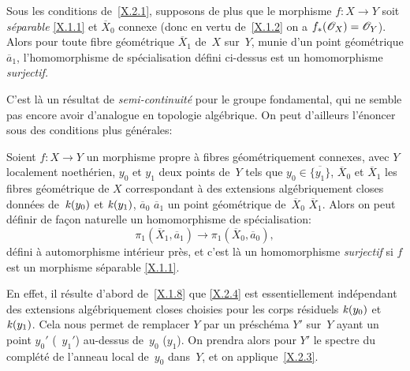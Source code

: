 \begin{corollaire}
\label{X.2.3}
Sous les conditions de~\ref{X.2.1}, supposons de plus que le morphisme
$f\colon X\to Y$ soit \emph{séparable} \eqref{X.1.1} et $\overline
X_0$ connexe (donc en vertu de~\ref{X.1.2} on a
$f_*(\cal{O}_X)=\cal{O}_Y$). Alors pour toute fibre
g\'eom\'etrique $\overline X_1$ de~$X$ sur~$Y$, munie d'un point
g\'eom\'etrique $\overline a_1$, l'homomorphisme de
sp\'ecialisation
d\'efini ci-dessus est un homomorphisme \emph{surjectif.}
\end{corollaire}
C'est l\`a un r\'esultat de \emph{semi-continuité} pour le
groupe fondamental, qui ne semble pas encore avoir d'analogue en
topologie alg\'ebrique. On peut d'ailleurs l'\'enoncer sous des
conditions plus g\'en\'erales:

\begin{corollaire}
\label{X.2.4}
Soient
$f\colon X\to Y$ un morphisme propre \`a fibres
g\'eom\'etriquement connexes, avec $Y$ localement noeth\'erien,
$y_0$ et $y_1$ deux points de~$Y$ tels que $y_0\in\overline{\{y_1\}}$,
$\overline X_0$ et $\overline X_1$ les fibres g\'eom\'etrique de
$X$ correspondant \`a des extensions alg\'ebriquement closes
donn\'ees de~$\mathit{k}(y_0)$ et $\mathit{k}(y_1)$, $\overline a_0$
\resp $\overline a_1$ un point g\'eom\'etrique de~$\overline X_0$
\resp $\overline X_1$. Alors on peut d\'efinir de fa\c con
naturelle un homomorphisme de sp\'ecialisation:
$$
\pi_1(\overline X_1,\overline a_1)\to \pi_1(\overline X_0,\overline
a_0),
$$
d\'efini \`a automorphisme int\'erieur pr\`es, et c'est l\`a
un homomorphisme \emph{surjectif} si $f$ est un morphisme
s\'eparable \eqref{X.1.1}.
\end{corollaire}

En effet, il r\'esulte d'abord de~\ref{X.1.8} que \ref{X.2.4} est
essentiellement ind\'ependant des extensions alg\'ebriquement
closes choisies pour les corps r\'esiduels $\mathit{k}(y_0)$
et~$\mathit{k}(y_1)$. Cela nous permet de remplacer $Y$ par un
pr\'esch\'ema $Y'$ sur~$Y$ ayant un point $y_0'$ (\resp~$y_1'$)
au-dessus de~$y_0$ (\resp $y_1$). On prendra alors pour $Y'$ le
spectre du compl\'et\'e de l'anneau local de~$y_0$ dans~$Y$, et on
applique~\ref{X.2.3}.

